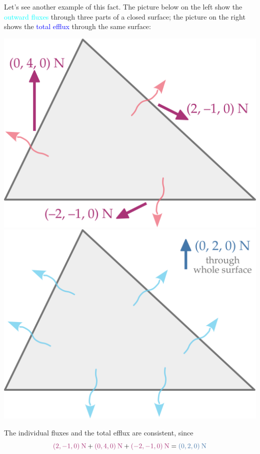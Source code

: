 \documentclass[a4paper,12pt,%
onecolumn,oneside,%
british%
]{memoir}
\renewcommand*{\|}[1][]{\nonscript\:#1\vert\nonscript\:\mathopen{}}
\begin{document}
Let's see another example of this fact. The picture below on the left show the \textcolor{cyan}{outward fluxes} through three parts of a closed surface; the picture on the right shows the \textcolor{blue}{total efflux} through the same surface:
\begin{center}
  \hspace*{\fill}
  \includegraphics[align=t,width=0.4\linewidth]{images/flux_closed_3.pdf}
  \hfill
  \includegraphics[align=t,width=0.4\linewidth]{images/flux_closed_3_sum.pdf}
  \hspace*{\fill}
\end{center}
The individual fluxes and the total efflux are consistent, since
\begin{equation*}
  \mathcolor{purple}{(2,-1,0)\:\unit{N}} +
  \mathcolor{purple}{(0,4,0)\:\unit{N}} +
  \mathcolor{purple}{(-2,-1,0)\:\unit{N}} =
  \mathcolor{blue}{(0,2,0)\:\unit{N}}
\end{equation*}



\bigskip
\end{document}
